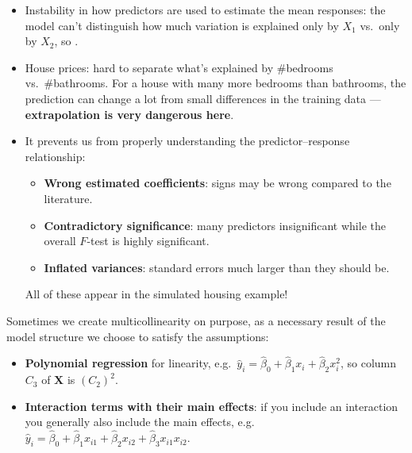 \begin{remark}
    \begin{itemize}
        \item Instability in how predictors are used to estimate the mean responses: the model
        can't distinguish how much variation is explained only by $X_1$ vs.\ only by $X_2$, so
        .
        \item House prices: hard to separate what's explained by \#bedrooms vs.\ \#bathrooms. For
        a house with many more bedrooms than bathrooms, the prediction can change a lot from small
        differences in the training data --- \textbf{extrapolation is very dangerous here}.
        \item It prevents us from properly understanding the predictor--response relationship:
        \begin{itemize}
            \item \textbf{Wrong estimated coefficients}: signs may be wrong compared to the literature.
            \item \textbf{Contradictory significance}: many predictors insignificant while the
            overall $F$-test is highly significant.
            \item \textbf{Inflated variances}: standard errors much larger than they should be.
        \end{itemize}
        All of these appear in the simulated housing example!
    \end{itemize}
\end{remark}

\begin{remark}
    Sometimes we create multicollinearity on purpose, as a necessary result of the model
    structure we choose to satisfy the assumptions:
    \begin{itemize}
        \item \textbf{Polynomial regression} for linearity, e.g.\ $\hat y_i=\hat\beta_0+\hat\beta_1x_i+\hat\beta_2x_i^2$,
        so column $C_3$ of $\mathbf{X}$ is $(C_2)^2$.
        \item \textbf{Interaction terms with their main effects}: if you include an interaction you
        generally also include the main effects, e.g.\
        $\hat y_i=\hat\beta_0+\hat\beta_1x_{i1}+\hat\beta_2x_{i2}+\hat\beta_3x_{i1}x_{i2}$.
    \end{itemize}
\end{remark}

